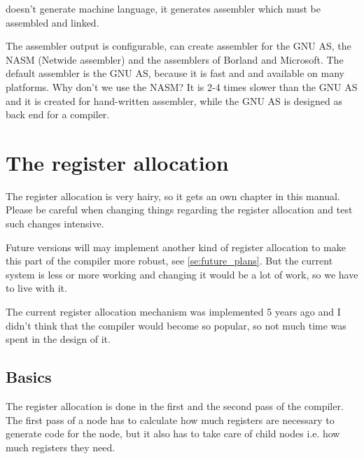 \documentclass{report}
\begin{document}
\fpc doesn't generate machine language, it generates
assembler which must be assembled and linked.

The assembler output is configurable, \fpc can create
assembler for the GNU AS, the NASM (Netwide assembler) and
the assemblers of Borland and Microsoft. The default assembler
is the GNU AS, because it is fast and and available on
many platforms. Why don't we use the NASM? It is 2-4 times
slower than the GNU AS and it is created for
hand-written assembler, while the GNU AS is designed
as back end for a compiler.


\chapter{The register allocation}

The register allocation is very hairy, so it gets
an own chapter in this manual. Please be careful when changing things
regarding the register allocation and test such changes intensive.

Future versions will may implement another kind of register allocation 
to make this part of the compiler more robust, see
\ref{se:future_plans}. But the current
system is less or more working and changing it would be a lot of
work, so we have to live with it.

The current register allocation mechanism was implemented 5 years
ago and I didn't think that the compiler would become
so popular, so not much time was spent in the design of it.

\section{Basics}

The register allocation is done in the first and the second pass of
the compiler.
The first pass of a node has to calculate how much registers
are necessary to generate code for the node, but it also has
to take care of child nodes i.e. how much registers
they need.
\end{document}
